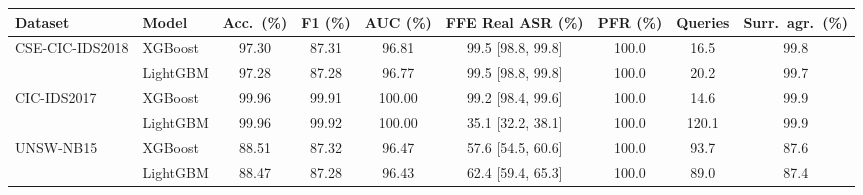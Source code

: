 \begin{tabular}{@{}llccccccc@{}}
\toprule
\textbf{Dataset} & \textbf{Model} & \textbf{Acc.\ (\%)} & \textbf{F1 (\%)} & \textbf{AUC (\%)} & \textbf{FFE Real ASR (\%)} & \textbf{PFR (\%)} & \textbf{Queries} & \textbf{Surr.\ agr.\ (\%)} \\
\midrule
CSE-CIC-IDS2018 & XGBoost & 97.30 & 87.31 & 96.81 & 99.5 [98.8, 99.8] & 100.0 & 16.5 & 99.8 \\
 & LightGBM & 97.28 & 87.28 & 96.77 & 99.5 [98.8, 99.8] & 100.0 & 20.2 & 99.7 \\
CIC-IDS2017 & XGBoost & 99.96 & 99.91 & 100.00 & 99.2 [98.4, 99.6] & 100.0 & 14.6 & 99.9 \\
 & LightGBM & 99.96 & 99.92 & 100.00 & 35.1 [32.2, 38.1] & 100.0 & 120.1 & 99.9 \\
UNSW-NB15 & XGBoost & 88.51 & 87.32 & 96.47 & 57.6 [54.5, 60.6] & 100.0 & 93.7 & 87.6 \\
 & LightGBM & 88.47 & 87.28 & 96.43 & 62.4 [59.4, 65.3] & 100.0 & 89.0 & 87.4 \\
\bottomrule
\end{tabular}
